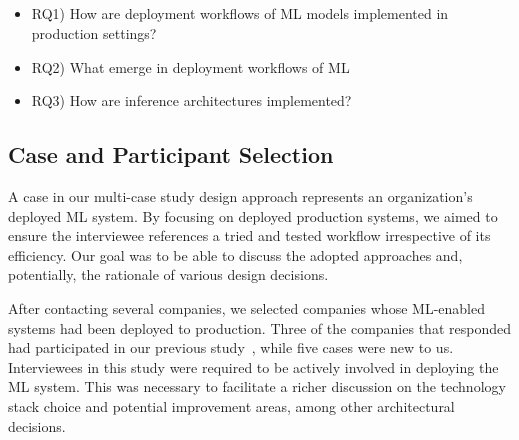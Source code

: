 {%
}

\subsection{}
\addtocounter{subsection}{-1}%
\DIFdelend \begin{itemize}
    \item RQ1) How are deployment workflows of ML \DIFdelbegin {}\DIFdelend models implemented in production settings?
    \item RQ2) What \DIFdelbegin {}\DIFdelend \DIFaddbegin {}\DIFaddend emerge in deployment workflows of ML \DIFdelbegin {}\DIFdelend \DIFaddbegin {}\DIFaddend \item RQ3) How are inference architectures implemented?
\end{itemize}

\subsection{Case and Participant Selection}
A case in our multi-case study design approach represents an organization's deployed ML \DIFdelbegin {}\DIFdelend system. By focusing on deployed production systems, we aimed to ensure the interviewee references a tried and tested workflow irrespective of its efficiency. Our goal was to be able to discuss the adopted approaches and, potentially, the rationale of various design decisions.

After contacting several companies, we selected companies whose ML-enabled systems had been deployed to production. Three of the companies that responded had participated in our previous study~\cite{muiruri2022practices}, while five cases were new to us. Interviewees in this study were required to be actively involved in deploying the ML system. This was necessary to facilitate a richer discussion on the technology stack choice and potential improvement areas, among other architectural decisions.


